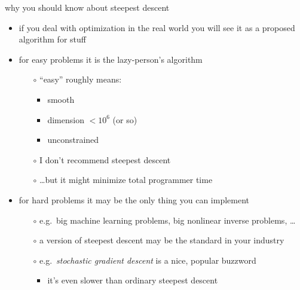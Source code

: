 \documentclass[10pt,hyperref]{beamer}
\begin{document}
\begin{frame}{why you should know about steepest descent}

\begin{itemize}
\item if you deal with optimization in the real world you will see it as a proposed algorithm for stuff
\item for easy problems it is the lazy-person's algorithm
        \begin{itemize}
        \item[$\circ$] ``easy'' roughly means:
            \begin{itemize}
            \item smooth
            \item dimension $< 10^6$ (or so)
            \item unconstrained
            \end{itemize}
        \item[$\circ$] \alert{I don't recommend steepest descent}
        \item[$\circ$] \dots but it might minimize total programmer time
        \end{itemize}
\item for hard problems it may be the only thing you can implement
        \begin{itemize}
        \item[$\circ$] e.g.~big machine learning problems, big nonlinear inverse problems, \dots
        \item[$\circ$] a version of steepest descent may be the standard in your industry
        \item[$\circ$] e.g.~\emph{stochastic gradient descent} is a nice, popular buzzword
            \begin{itemize}
            \item it's even slower than ordinary steepest descent
            \end{itemize}
        \end{itemize}
\end{itemize}
\end{frame}
\end{document}
